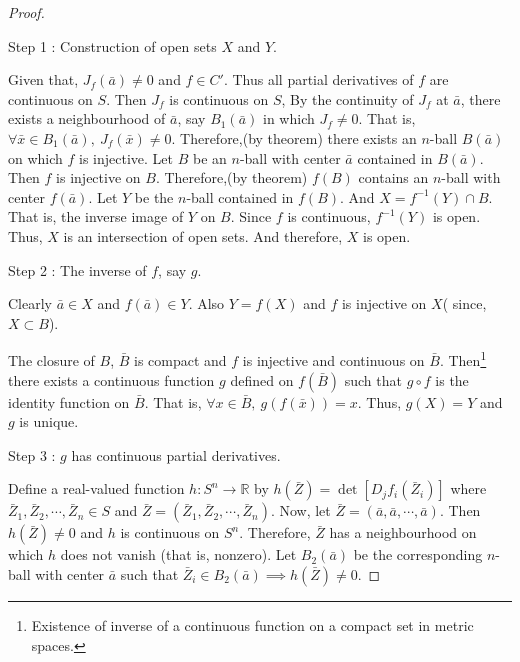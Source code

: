 \begin{proof}
\begin{commentary}Step 1 : Construction of open sets $X$ and $Y$.\end{commentary}

Given that, $J_f(\bar{a}) \ne 0$ and $f \in C'$.
Thus all partial derivatives of $f$ are continuous on $S$.
Then $J_f$ is continuous on $S$, 
By the continuity of $J_f$ at $\bar{a}$, there exists a neighbourhood of $\bar{a}$, say $B_1(\bar{a})$ in which $J_f \ne 0$.
That is, $\forall \bar{x} \in B_1(\bar{a}),\ J_f(\bar{x}) \ne 0$.
Therefore,(by theorem) there exists an $n$-ball $B(\bar{a})$ on which $f$ is injective.
Let $B$ be an $n$-ball with center $\bar{a}$ contained in $B(\bar{a})$.
Then $f$ is injective on $B$.
Therefore,(by theorem) $f(B)$ contains an $n$-ball with center $f(\bar{a})$.
Let $Y$ be the $n$-ball contained in $f(B)$.
And  $X=f^{-1}(Y) \cap B$.
That is, the inverse image of $Y$ on $B$.
Since $f$ is continuous, $f^{-1}(Y)$ is open.
Thus, $X$ is an intersection of open sets.
And therefore, $X$ is open.\\
\begin{commentary}Step 2 : The inverse of $f$, say $g$.\end{commentary}

Clearly $\bar{a} \in X$ and $f(\bar{a}) \in Y$.
Also $Y = f(X)$ and $f$ is injective on $X$( since, $X \subset B$).

The closure of $B$, $\bar{B}$ is compact and $f$ is injective and continuous on $\bar{B}$.
Then\footnote{Existence of inverse of a continuous function on a compact set in metric spaces.} there exists a continuous function $g$ defined on $f(\bar{B})$ such that $g \circ f$ is the identity function on $\bar{B}$.
That is, $\forall x \in \bar{B},\ g(f(\bar{x})) = x$.
Thus, $g(X) = Y$ and $g$ is unique.\\
\begin{commentary}Step 3 : $g$ has continuous partial derivatives.\end{commentary}

Define a real-valued function $h : S^n \to \mathbb{R}$ by $h(\bar{Z}) = \det[D_jf_i(\bar{Z}_i)]$ where $\bar{Z}_1,\bar{Z}_2,\cdots,\bar{Z}_n \in S$ and $\bar{Z} = (\bar{Z}_1,\bar{Z}_2,\cdots,\bar{Z}_n)$.
Now, let $\bar{Z} = (\bar{a},\bar{a},\cdots,\bar{a})$.
Then $h(\bar{Z}) \ne 0$ and $h$ is continuous on $S^n$.
Therefore, $\bar{Z}$ has a neighbourhood on which $h$ does not vanish (that is, nonzero).
Let $B_2(\bar{a})$ be the corresponding $n$-ball with center $\bar{a}$ such that $\bar{Z}_i \in B_2(\bar{a}) \implies h(\bar{Z}) \ne 0$.


\end{proof}
